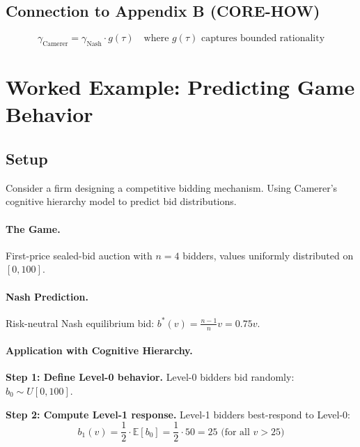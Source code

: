 \subsection{Connection to Appendix B (CORE-HOW)}

\begin{equation}
\gamma_{\text{Camerer}} = \gamma_{\text{Nash}} \cdot g(\tau) \quad \text{where } g(\tau) \text{ captures bounded rationality}
\end{equation}


\section{Worked Example: Predicting Game Behavior}
\label{sec:ca-example}

\subsection{Setup}
Consider a firm designing a competitive bidding mechanism. Using Camerer's cognitive hierarchy model to predict bid distributions.

\paragraph{The Game.} First-price sealed-bid auction with $n = 4$ bidders, values uniformly distributed on $[0, 100]$.

\paragraph{Nash Prediction.} Risk-neutral Nash equilibrium bid: $b^*(v) = \frac{n-1}{n} v = 0.75v$.

\paragraph{Application with Cognitive Hierarchy.}

\textbf{Step 1: Define Level-0 behavior.}
Level-0 bidders bid randomly: $b_0 \sim U[0, 100]$.

\textbf{Step 2: Compute Level-1 response.}
Level-1 bidders best-respond to Level-0:
\begin{equation}
b_1(v) = \frac{1}{2} \cdot \mathbb{E}[b_0] = \frac{1}{2} \cdot 50 = 25 \text{ (for all } v > 25\text{)}
\end{equation}

